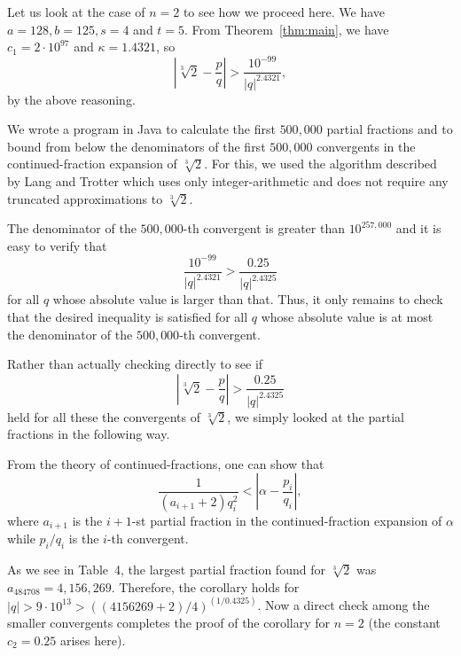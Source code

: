\documentclass{jT}
\theoremstyle{definition}
\begin{document}
Let us look at the case of $n=2$ to see how we proceed 
here. We have $a=128, b=125, s=4$ and $t=5$. From Theorem~\ref{thm:main},
we have $c_{1}=2 \cdot 10^{97}$ and $\kappa=1.4321$, so 
\begin{displaymath}
\left| \sqrt[3]{2} - \frac{p}{q} \right| 
> \frac{10^{-99}}{|q|^{2.4321}},  
\end{displaymath}
by the above reasoning. 

We wrote a program in Java to calculate the first $500, 000$ partial fractions
and to bound from below the denominators of the first $500, 000$ convergents
in the continued-fraction expansion of $\sqrt[3]{2}$. For this, we used the algorithm
described  by Lang and Trotter \cite{LT} which uses only integer-arithmetic 
and does not require any truncated approximations to $\sqrt[3]{2}$. 

The denominator of the $500, 000$-th convergent is greater than $10^{257, 000}$ 
and it is easy to verify that 
\begin{displaymath}
\frac{10^{-99}}{|q|^{2.4321}} > \frac{0.25}{|q|^{2.4325}} 
\end{displaymath}
for all $q$ whose absolute value is larger than that. 
Thus, it only remains to check that the desired inequality 
is satisfied for all $q$ whose absolute value is at most 
the denominator of the $500, 000$-th convergent. 

Rather than actually checking directly to see if 
\begin{displaymath}
\left| \sqrt[3]{2} - \frac{p}{q} \right| > \frac{0.25}{|q|^{2.4325}} 
\end{displaymath}
held for all these the convergents of $\sqrt[3]{2}$, we simply 
looked at the partial fractions in the following way. 

From the theory of continued-fractions, one can show that 
\begin{displaymath}
\frac{1}{\left( a_{i+1} + 2 \right) q_{i}^{2}} 
< \left| \alpha - \frac{p_{i}}{q_{i}} \right|, 
\end{displaymath}
where $a_{i+1}$ is the $i+1$-st partial fraction 
in the continued-fraction expansion of $\alpha$ 
while $p_{i}/q_{i}$ is the $i$-th convergent. 

As we see in Table~4, the largest partial fraction found for $\sqrt[3]{2}$
was $a_{484708}=4,156,269$. Therefore, the corollary holds for
$|q| > 9 \cdot 10^{13} > ((4156269+2)/4)^{(1/0.4325)}$.
Now a direct check among the smaller convergents completes the proof of
the corollary for $n=2$ (the constant $c_{2}=0.25$ arises here).
\end{document}
